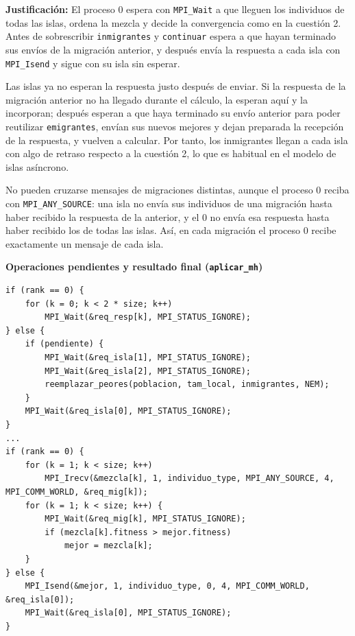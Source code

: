 \documentclass[12pt]{article}
\begin{document}
\begin{enumerate}
\textbf{Justificación:} El proceso 0 espera con \texttt{MPI\_Wait} a que lleguen los individuos de todas las islas, ordena la mezcla y decide la convergencia como en la cuestión 2. Antes de sobrescribir \texttt{inmigrantes} y \texttt{continuar} espera a que hayan terminado sus envíos de la migración anterior, y después envía la respuesta a cada isla con \texttt{MPI\_Isend} y sigue con su isla sin esperar.

Las islas ya no esperan la respuesta justo después de enviar. Si la respuesta de la migración anterior no ha llegado durante el cálculo, la esperan aquí y la incorporan; después esperan a que haya terminado su envío anterior para poder reutilizar \texttt{emigrantes}, envían sus nuevos mejores y dejan preparada la recepción de la respuesta, y vuelven a calcular. Por tanto, los inmigrantes llegan a cada isla con algo de retraso respecto a la cuestión 2, lo que es habitual en el modelo de islas asíncrono.

No pueden cruzarse mensajes de migraciones distintas, aunque el proceso 0 reciba con \texttt{MPI\_ANY\_SOURCE}: una isla no envía sus individuos de una migración hasta haber recibido la respuesta de la anterior, y el 0 no envía esa respuesta hasta haber recibido los de todas las islas. Así, en cada migración el proceso 0 recibe exactamente un mensaje de cada isla.

\vspace{0.5cm}


\medskip
\noindent\textbf{Operaciones pendientes y resultado final (\texttt{aplicar\_mh})}\par
\smallskip

\begin{lstlisting}[style=EstiloC]
if (rank == 0) {
	for (k = 0; k < 2 * size; k++)
		MPI_Wait(&req_resp[k], MPI_STATUS_IGNORE);
} else {
	if (pendiente) {
		MPI_Wait(&req_isla[1], MPI_STATUS_IGNORE);
		MPI_Wait(&req_isla[2], MPI_STATUS_IGNORE);
		reemplazar_peores(poblacion, tam_local, inmigrantes, NEM);
	}
	MPI_Wait(&req_isla[0], MPI_STATUS_IGNORE);
}
...
if (rank == 0) {
	for (k = 1; k < size; k++)
		MPI_Irecv(&mezcla[k], 1, individuo_type, MPI_ANY_SOURCE, 4, MPI_COMM_WORLD, &req_mig[k]);
	for (k = 1; k < size; k++) {
		MPI_Wait(&req_mig[k], MPI_STATUS_IGNORE);
		if (mezcla[k].fitness > mejor.fitness)
			mejor = mezcla[k];
	}
} else {
	MPI_Isend(&mejor, 1, individuo_type, 0, 4, MPI_COMM_WORLD, &req_isla[0]);
	MPI_Wait(&req_isla[0], MPI_STATUS_IGNORE);
}
\end{lstlisting}


\end{enumerate}
\end{document}
